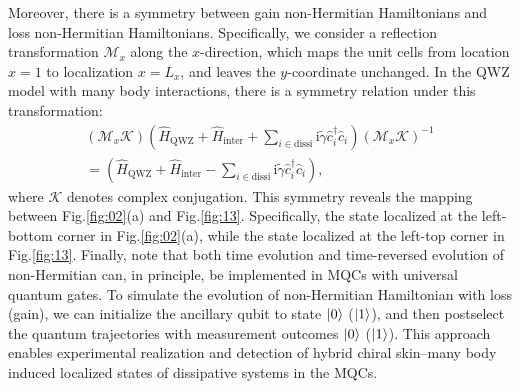 \documentclass[longbibliography, aps, prx, amsmath, amssymb, amsfonts, twocolumn,superscriptaddress, footinbib]{revtex4-1}
\begin{document}
	Moreover, there is a symmetry between gain non-Hermitian Hamiltonians and loss non-Hermitian Hamiltonians. Specifically, we consider a reflection transformation $\mathcal{M}_x$ along the $x$-direction, which maps the unit cells from location $x = 1$ to localization $x = L_x$, and leaves the $y$-coordinate unchanged. In the QWZ model with many body interactions, there is a symmetry relation under this transformation:
	\begin{equation}
		\begin{split}
			(\mathcal{M}_x \mathcal{K})(\hat{H}_{\text{QWZ}} + \hat{H}_{\text{inter}} + \sum_{i\in \text{dissi}} \mathrm{i}\tilde{\gamma} \hat{c}_i^{\dagger} \hat{c}_i ) (\mathcal{M}_x \mathcal{K})^{-1} \\
			= (\hat{H}_{\text{QWZ}} + \hat{H}_{\text{inter}} - \sum_{i\in \text{dissi}} \mathrm{i}\tilde{\gamma} \hat{c}_i^{\dagger} \hat{c}_i),
		\end{split}
	\end{equation}
	where $\mathcal{K}$ denotes complex conjugation. This symmetry reveals the mapping between Fig.\ref{fig:02}(a) and Fig.\ref{fig:13}. Specifically, the state localized at the left-bottom corner in Fig.\ref{fig:02}(a), while the state localized at the left-top corner in Fig.\ref{fig:13}.
	Finally, note that both time evolution and time-reversed evolution of non-Hermitian can, in principle, be implemented in MQCs with universal quantum gates. To simulate the evolution of non-Hermitian Hamiltonian with loss (gain), we can initialize the ancillary qubit to state $\ket{0}$ ($\ket{1}$), and then postselect the quantum trajectories with measurement outcomes $\ket{0}$ ($\ket{1}$). This approach enables experimental realization and detection of hybrid chiral skin–many body induced localized states of dissipative systems in the MQCs.
\end{document}
